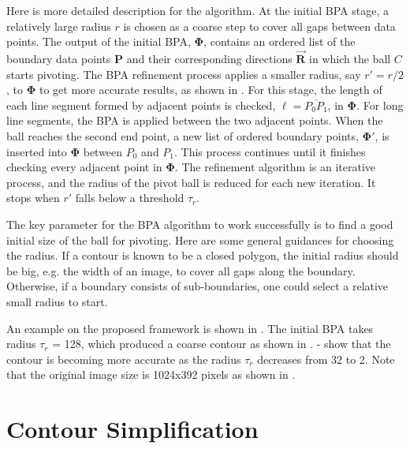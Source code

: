 Here is more detailed description for the algorithm.
At the initial BPA stage, a relatively large radius $r$ is chosen
as a coarse step to cover all gaps between data points.
The output of the initial BPA, $\boldsymbol{\Phi}$,
contains an ordered list of the boundary data points $\boldsymbol{P}$
and their corresponding directions $\overrightarrow{\boldsymbol{R}}$
in which the ball $C$ starts pivoting.
The BPA refinement process applies a smaller radius, say $r' = r/2$,
to $\boldsymbol{\Phi}$ to get more accurate results, as shown in .
For this stage, the length of each line segment formed by adjacent points is checked,
$\ell = \overline{P_0P_1}$, in $\boldsymbol{\Phi}$.
For long line segments, the BPA is applied between the two adjacent points.
When the ball reaches the second end point,
a new list of ordered boundary points,
$\boldsymbol{\Phi'}$, is inserted into $\boldsymbol{\Phi}$ between $P_0$ and $P_1$.
This process continues until it finishes
checking every adjacent point in $\boldsymbol{\Phi}$.
The refinement algorithm is an iterative process,
and the radius of the pivot ball is reduced for each new iteration.
It stops when $r'$ falls below a threshold $\tau_r$.

The key parameter for the BPA algorithm to work successfully is
to find a good initial size of the ball for pivoting.
Here are some general guidances for choosing the radius.
If a contour is known to be a closed polygon,
the initial radius should be big, e.g. the width of an image,
to cover all gaps along the boundary.
Otherwise, if a boundary consists of sub-boundaries,
one could select a relative small radius to start.

An example on the proposed framework
is shown in .
The initial BPA takes radius $\tau_r$ = 128,
which produced a coarse contour as shown in .
 -  show that
the contour is becoming more accurate
as the radius $\tau_r$ decreases from 32 to 2.
Note that the original image size is 1024x392 pixels
as shown in .

\section{Contour Simplification}
\label{sec:BPA_HT}


